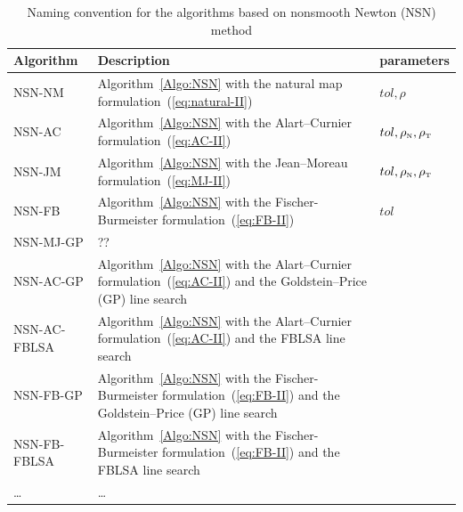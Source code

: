 \begin{table}[htbp]
  \centering
  \begin{tabular}{|l|p{}|l|}
    \hline
    { Algorithm}
    & Description 
    & parameters\\
    \hline
    \sf NSN-NM 
    &  Algorithm~\ref{Algo:NSN} with the natural map formulation~(\ref{eq:natural-II})
    &  $tol, \rho$\\
    \hline
    \sf NSN-AC
    &  Algorithm~\ref{Algo:NSN} with the Alart--Curnier formulation~(\ref{eq:AC-II})
    &  $tol, \rho_{\hbox{\tiny{N}}}, \rho_{\hbox{\tiny{T}}}$\\
    \hline
    \sf NSN-JM 
    &  Algorithm~\ref{Algo:NSN} with the Jean--Moreau formulation~(\ref{eq:MJ-II})
    & $tol, \rho_{\hbox{\tiny{N}}}, \rho_{\hbox{\tiny{T}}}$\\
    \hline
    \sf NSN-FB 
    &  Algorithm~\ref{Algo:NSN} with the Fischer-Burmeister formulation~(\ref{eq:FB-II})
    & $tol$\\
    \hline
    \sf NSN-MJ-GP
    &  ??
    & \\
    \hline
    \sf NSN-AC-GP
    &  Algorithm~\ref{Algo:NSN} with the Alart--Curnier formulation~(\ref{eq:AC-II}) and the Goldstein--Price (GP) line search
    & \\
    \hline
    \sf NSN-AC-FBLSA
    &  Algorithm~\ref{Algo:NSN} with the Alart--Curnier formulation~(\ref{eq:AC-II}) and the FBLSA line search
    & \\
    \hline
    \sf NSN-FB-GP 
    &  Algorithm~\ref{Algo:NSN} with the Fischer-Burmeister formulation~(\ref{eq:FB-II}) and the Goldstein--Price (GP) line search
    & \\
    \hline
    \sf NSN-FB-FBLSA
    &  Algorithm~\ref{Algo:NSN} with the Fischer-Burmeister formulation~(\ref{eq:FB-II}) and the  FBLSA line search
    & \\
    \hline
    \sf \ldots 
    &  \ldots
    & \\
    \hline
  \end{tabular}
  \caption{Naming convention for the algorithms based on nonsmooth Newton (NSN) method}
  \label{tab:NSN-algos}
\end{table}

